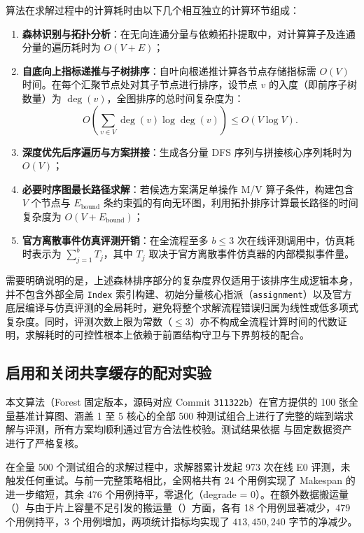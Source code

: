 \documentclass[anonymous,notoc]{gmcm2026}
\providecommand{\tightlist}{\setlength{\itemsep}{0pt}\setlength{\parskip}{0pt}}
\begin{document}
算法在求解过程中的计算耗时由以下几个相互独立的计算环节组成：

\begin{enumerate}
\def\labelenumi{\arabic{enumi}.}
\tightlist
\item
  \textbf{森林识别与拓扑分析}：在无向连通分量与依赖拓扑提取中，对计算算子及连通分量的遍历耗时为 \(O(V + E)\)；
\item
  \textbf{自底向上指标递推与子树排序}：自叶向根递推计算各节点存储指标需 \(O(V)\) 时间。在每个汇聚节点处对其子节点进行排序，设节点 \(v\) 的入度（即前序子树数量）为 \(\deg(v)\)，全图排序的总时间复杂度为： \begin{equation}
O\left( \sum_{v \in V} \deg(v) \log \deg(v) \right) \le O(V \log V).
\end{equation}
\item
  \textbf{深度优先后序遍历与方案拼接}：生成各分量 DFS 序列与拼接核心序列耗时为 \(O(V)\)；
\item
  \textbf{必要时序图最长路径求解}：若候选方案满足单操作 M/V 算子条件，构建包含 \(V\) 个节点与 \(E_{\mathrm{bound}}\) 条约束弧的有向无环图，利用拓扑排序计算最长路径的时间复杂度为 \(O(V + E_{\mathrm{bound}})\)；
\item
  \textbf{官方离散事件仿真评测开销}：在全流程至多 \(b \le 3\) 次在线评测调用中，仿真耗时表示为 \(\sum_{j=1}^b T_j\)，其中 \(T_j\) 取决于官方离散事件仿真器的内部模拟事件量。
\end{enumerate}

需要明确说明的是，上述森林排序部分的复杂度界仅适用于该排序生成逻辑本身，并不包含外部全局 \texttt{Index} 索引构建、初始分量核心指派（\texttt{assignment}）以及官方底层编译与仿真评测的全局耗时，避免将整个求解流程错误归属为线性或低多项式复杂度。同时，评测次数上限为常数（\(\le 3\)）亦不构成全流程计算时间的代数证明，求解耗时的可控性根本上依赖于前置结构守卫与下界剪枝的配合。

\subsection{启用和关闭共享缓存的配对实验}

本文算法（Forest 固定版本，源码对应 Commit \texttt{311322b}）在官方提供的 100 张全量基准计算图、涵盖 1 至 5 核心的全部 500 种测试组合上进行了完整的端到端求解与评测，所有方案均顺利通过官方合法性校验。测试结果依据 \texttt{} 与固定数据资产进行了严格复核。

在全量 500 个测试组合的求解过程中，求解器累计发起 973 次在线 E0 评测，未触发任何重试。与前一完整策略相比，全网格共有 24 个用例实现了 Makespan 的进一步缩短，其余 476 个用例持平，零退化（degrade = 0）。在额外数据搬运量（\texttt{}）与由于片上容量不足引发的搬运量（\texttt{}）方面，各有 18 个用例显著减少，479 个用例持平，3 个用例增加，两项统计指标均实现了 \(413{,}450{,}240\) 字节的净减少。
\end{document}
